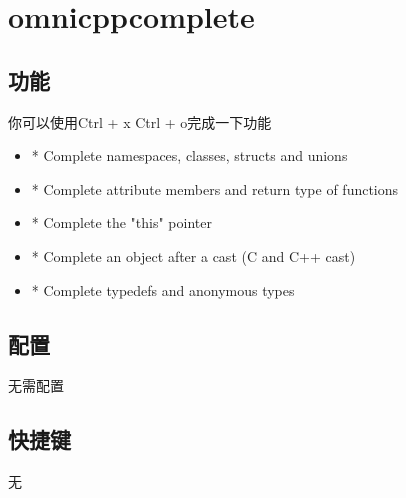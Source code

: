 \chapter{omnicppcomplete}

\section{功能}
你可以使用Ctrl + x Ctrl + o完成一下功能
\begin{itemize}
    \item * Complete namespaces, classes, structs and unions
    \item * Complete attribute members and return type of functions
    \item * Complete the "this" pointer
    \item * Complete an object after a cast (C and C++ cast)
    \item * Complete typedefs and anonymous types
\end{itemize}

\section{配置}
无需配置

\section{快捷键}
无

\newpage
